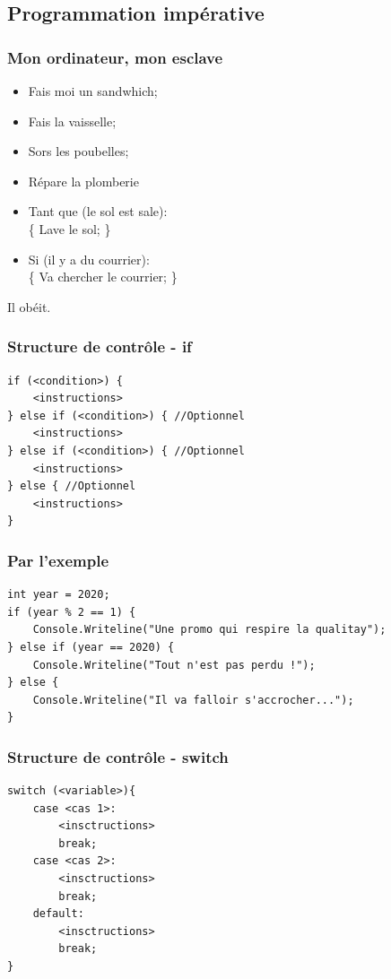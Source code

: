 \documentclass{beamer}
\begin{document}
\subsection{Programmation impérative}

\begin{frame}[fragile]
\frametitle{Mon ordinateur, mon esclave}
\begin{itemize}
\item<+-> Fais moi un sandwhich;
\item<+-> Fais la vaisselle;
\item<+-> Sors les poubelles;
\item<+-> Répare la plomberie
\item<+-> Tant que (le sol est sale):\\
	\{ Lave le sol; \}
\item<+-> Si (il y a du courrier):\\
	\{ Va chercher le courrier; \}
\end{itemize}
\pause
Il obéit.
\end{frame}

\begin{frame}[fragile]
\frametitle{Structure de contrôle - if}
\begin{lstlisting}
if (<condition>) {
    <instructions>
} else if (<condition>) { //Optionnel
    <instructions>
} else if (<condition>) { //Optionnel
    <instructions>
} else { //Optionnel
    <instructions>
}
\end{lstlisting}
\end{frame}

\begin{frame}[fragile]
\frametitle{Par l'exemple}
\begin{lstlisting}
int year = 2020;
if (year % 2 == 1) {
    Console.Writeline("Une promo qui respire la qualitay");
} else if (year == 2020) {
    Console.Writeline("Tout n'est pas perdu !");
} else {
    Console.Writeline("Il va falloir s'accrocher...");
}
\end{lstlisting}
\end{frame}

\begin{frame}[fragile]
\frametitle{Structure de contrôle - switch}
\begin{lstlisting}
switch (<variable>){
    case <cas 1>:
        <insctructions>
        break;
    case <cas 2>:
        <insctructions>
        break;
    default:
        <insctructions>
        break;
}
\end{lstlisting}
\end{frame}
\end{document}
